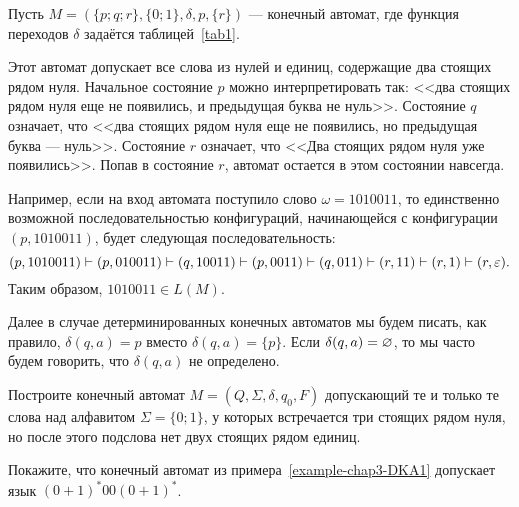 \begin{myexample}
\label{example-chap3-DKA1}
Пусть $M=(\{p;q;r\},\{0;1\},\delta,p,\{r\})$ --- конечный автомат, где функция переходов $\delta$ задаётся таблицей~\ref{tab1}. 

Этот автомат допускает все слова из нулей и единиц, содержащие два стоящих рядом нуля. Начальное состояние $p$ можно интерпретировать так: <<два стоящих рядом нуля еще не появились, и предыдущая буква не нуль>>. Состояние $q$ означает, что <<два стоящих рядом нуля еще не появились, но предыдущая буква --- нуль>>. Состояние $r$ означает, что <<Два стоящих рядом нуля уже появились>>. Попав в состояние $r$, автомат остается в этом состоянии навсегда.

Например, если на вход автомата поступило слово $\omega=1010011$, то единственно возможной последовательностью конфигураций, начинающейся с конфигурации $(p,1010011)$, будет следующая последовательность:
\[	(p,1010011)\vdash(p,010011)\vdash(q,10011)\vdash(p,0011)\vdash(q,011)\vdash(r,11)\vdash(r,1)\vdash(r,\varepsilon).
\]
Таким образом, $1010011\in L(M)$.
\end{myexample}

Далее в случае детерминированных конечных автоматов мы будем писать, как правило, $\delta(q,a)=p$ вместо $\delta(q,a)=\{p\}$. Если $\delta(q,a)=\varnothing$, то мы часто будем говорить, что $\delta(q,a)$ не определено.

\begin{myproblem}
Построите конечный автомат $M=(Q,\Sigma,\delta,q_0,F)$ допускающий те и только те слова над алфавитом $\Sigma=\{0;1\}$, у которых встречается три стоящих рядом нуля, но после этого подслова нет двух стоящих рядом единиц.
\end{myproblem}

\begin{myproblem}
Покажите, что конечный автомат из примера~\ref{example-chap3-DKA1} допускает язык $(0+1)^*00(0+1)^*$.
\end{myproblem}

